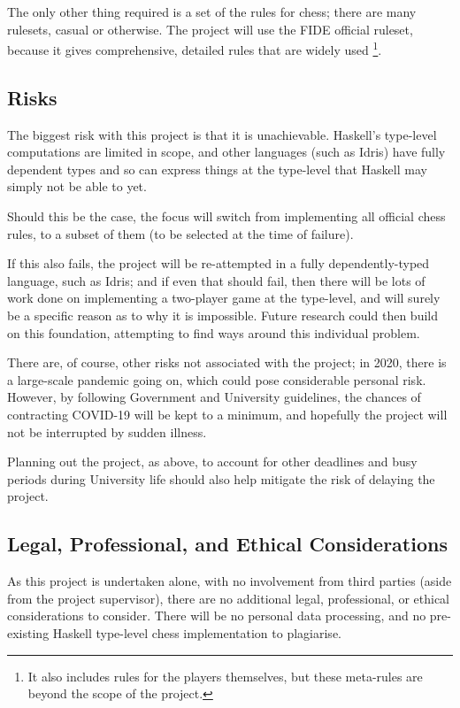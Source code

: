\documentclass[12pt, a4paper]{scrartcl}
\begin{document}
The only other thing required is a set of the rules for chess; there are many rulesets, casual or otherwise. The project will use the FIDE official ruleset, because it gives comprehensive, detailed rules that are widely used \footnote{It also includes rules for the players themselves, but these meta-rules are beyond the scope of the project.}.

\subsection{Risks}

The biggest risk with this project is that it is unachievable. Haskell's type-level computations are limited in scope, and other languages (such as Idris) have fully dependent types and so can express things at the type-level that Haskell may simply not be able to yet.

Should this be the case, the focus will switch from implementing all official chess rules, to a subset of them (to be selected at the time of failure).

If this also fails, the project will be re-attempted in a fully dependently-typed language, such as Idris; and if even that should fail, then there will be lots of work done on implementing a two-player game at the type-level, and will surely be a specific reason as to why it is impossible. Future research could then build on this foundation, attempting to find ways around this individual problem.

There are, of course, other risks not associated with the project; in 2020, there is a large-scale pandemic going on, which could pose considerable personal risk. However, by following Government and University guidelines, the chances of contracting COVID-19 will be kept to a minimum, and hopefully the project will not be interrupted by sudden illness.

Planning out the project, as above, to account for other deadlines and busy periods during University life should also help mitigate the risk of delaying the project.

\subsection{Legal, Professional, and Ethical Considerations}

As this project is undertaken alone, with no involvement from third parties (aside from the project supervisor), there are no additional legal, professional, or ethical considerations to consider. There will be no personal data processing, and no pre-existing Haskell type-level chess implementation to plagiarise.
\end{document}
